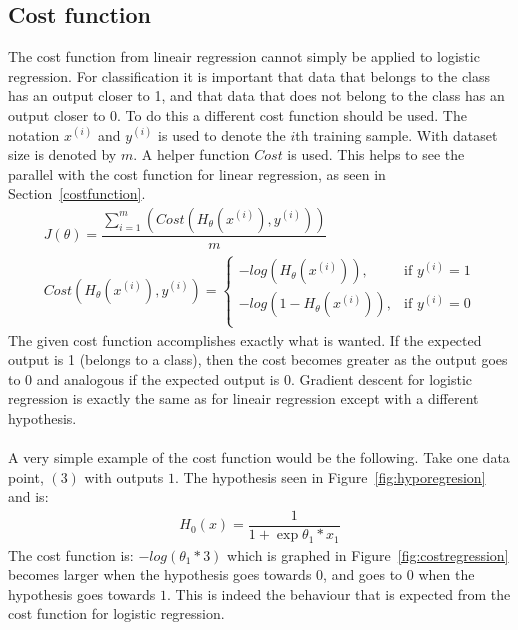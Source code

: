 \subsection{Cost function}
The cost function from lineair regression cannot simply be applied to logistic regression. For classification it is important that data that belongs to the class has an output closer to 1, and that data that does not belong to the class has an output closer to 0. To do this a different cost function should be used. The notation $x^{(i)}$ and $y^{(i)}$ is used to denote the $i$th training sample. With dataset size is denoted by $m$. A helper function $Cost$ is used. This helps to see the parallel with the cost function for linear regression, as seen in Section~\ref{costfunction}.  \cite{courseraLecturesCost}
\begin{gather}
J(\theta) = \dfrac{\sum\limits_{i=1}^m(Cost(H_\theta(x^{(i)}), y^{(i)}))}{m}\\
  Cost(H_\theta(x^{(i)}), y^{(i)}) =	\begin{cases}
        	 									     - log(H_\theta(x^{(i)})), & \text{if } y^{(i)} = 1\\
        									        - log(1 - H_\theta(x^{(i)})), & \text{if } y^{(i)} = 0\\
            									\end{cases}
\end{gather}
The given cost function accomplishes exactly what is wanted. If the expected output is 1 (belongs to a class), then the cost becomes greater as the output goes to 0 and analogous if the expected output is 0. Gradient descent for logistic regression is exactly the same as for lineair regression except with a different hypothesis. \\
\\
A very simple example of the cost function would be the following. Take one data point, $(3)$ with outputs $1$. The hypothesis seen in Figure~\ref{fig:hyporegresion} and is:
\begin{align}
H_0(x) = \dfrac{1}{1 + \exp{\theta_1 * x_1}}
\end{align}
\noindent The cost function is: $-log(\theta_1 * 3)$ which is graphed in Figure~\ref{fig:costregression} becomes larger when the hypothesis goes towards $0$, and goes to $0$ when the hypothesis goes towards $1$. This is indeed the behaviour that is expected from the cost function for logistic regression.


